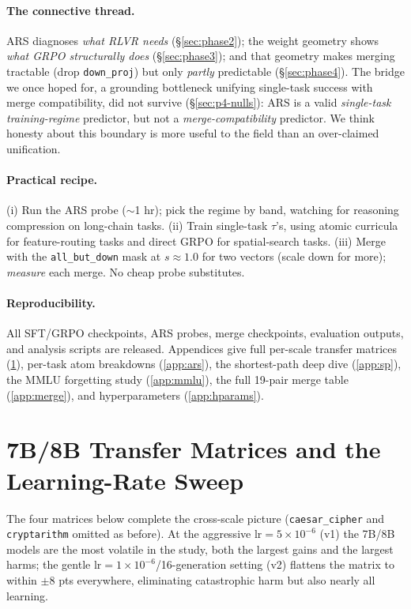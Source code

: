 \documentclass{article}
\newcommand{\tv}{\tau}
\begin{document}
\paragraph{The connective thread.} ARS diagnoses \emph{what RLVR needs} (\S\ref{sec:phase2}); the
weight geometry shows \emph{what GRPO structurally does} (\S\ref{sec:phase3}); and that geometry
makes merging tractable (drop \texttt{down\_proj}) but only \emph{partly} predictable
(\S\ref{sec:phase4}). The bridge we once hoped for, a grounding bottleneck unifying single-task
success with merge compatibility, did not survive (\S\ref{sec:p4-nulls}): ARS is a valid
\emph{single-task training-regime} predictor, but not a \emph{merge-compatibility} predictor. We
think honesty about this boundary is more useful to the field than an over-claimed unification.

\paragraph{Practical recipe.} (i) Run the ARS probe ($\sim$1 hr); pick the regime by band, watching
for reasoning compression on long-chain tasks. (ii) Train single-task $\tv$'s, using atomic
curricula for feature-routing tasks and direct GRPO for spatial-search tasks. (iii) Merge with the
\texttt{all\_but\_down} mask at $s{\approx}1.0$ for two vectors (scale down for more); \emph{measure}
each merge. No cheap probe substitutes.

\paragraph{Reproducibility.} All SFT/GRPO checkpoints, ARS probes, merge checkpoints, evaluation
outputs, and analysis scripts are released. Appendices give full per-scale transfer matrices
(\ref{app:p1}), per-task atom breakdowns (\ref{app:ars}), the shortest-path deep dive
(\ref{app:sp}), the MMLU forgetting study (\ref{app:mmlu}), the full 19-pair merge table
(\ref{app:merge}), and hyperparameters (\ref{app:hparams}).




\appendix
\section{7B/8B Transfer Matrices and the Learning-Rate Sweep}
\label{app:p1}
The four matrices below complete the cross-scale picture (\texttt{caesar\_cipher} and
\texttt{cryptarithm} omitted as before). At the aggressive $\mathrm{lr}{=}5\times10^{-6}$ (v1) the
7B/8B models are the most volatile in the study, both the largest gains and the largest harms;
the gentle $\mathrm{lr}{=}1\times10^{-6}$/16-generation setting (v2) flattens the matrix to within
$\pm 8$ pts everywhere, eliminating catastrophic harm but also nearly all learning.
\end{document}
